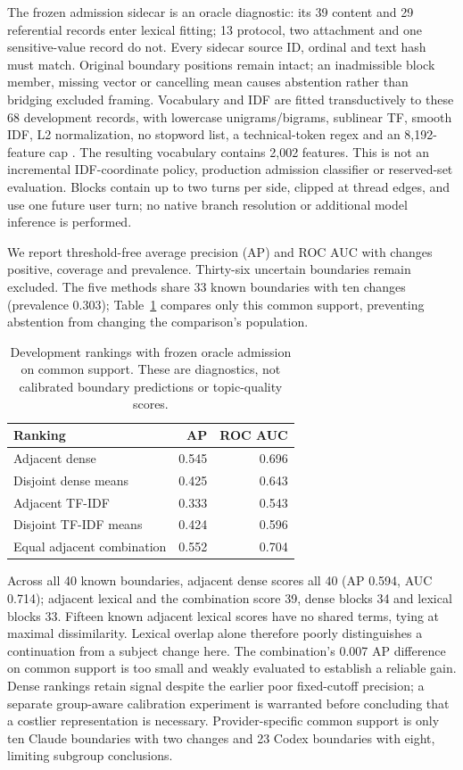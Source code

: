 \documentclass[11pt]{article}
\begin{document}
The frozen admission sidecar is an oracle diagnostic: its 39 content and 29
referential records enter lexical fitting; 13 protocol, two attachment and one
sensitive-value record do not. Every sidecar source ID, ordinal and text hash
must match. Original boundary positions remain intact; an inadmissible block
member, missing vector or cancelling mean causes abstention rather than bridging
excluded framing. Vocabulary and IDF are fitted transductively to these 68
development records, with lowercase unigrams/bigrams, sublinear TF, smooth IDF,
L2 normalization, no stopword list, a technical-token regex and an 8,192-feature
cap \cite{tfidf}. The resulting vocabulary contains 2,002 features. This is not
an incremental IDF-coordinate policy, production admission classifier or
reserved-set evaluation. Blocks contain up to two turns per side, clipped at
thread edges, and use one future user turn; no native
branch resolution or additional model inference is performed.

We report threshold-free average precision (AP) and ROC AUC with changes positive,
coverage and prevalence. Thirty-six uncertain boundaries remain excluded.
The five methods share 33 known boundaries with ten changes (prevalence 0.303);
Table~\ref{tab:lexical-rank} compares only this common support, preventing
abstention from changing the comparison's population.
\begin{table}[ht]
\centering
\begin{tabular}{lrr}
\toprule
Ranking & AP & ROC AUC\\
\midrule
Adjacent dense &0.545&0.696\\
Disjoint dense means &0.425&0.643\\
Adjacent TF-IDF &0.333&0.543\\
Disjoint TF-IDF means &0.424&0.596\\
Equal adjacent combination &0.552&0.704\\
\bottomrule
\end{tabular}
\caption{Development rankings with frozen oracle admission on common support.
These are diagnostics, not calibrated boundary predictions or topic-quality scores.}
\label{tab:lexical-rank}
\end{table}

Across all 40 known boundaries, adjacent dense scores all 40 (AP 0.594,
AUC 0.714); adjacent lexical and the combination score 39, dense blocks 34
and lexical blocks 33. Fifteen known adjacent lexical scores have no shared
terms, tying at maximal dissimilarity. Lexical overlap alone therefore poorly
distinguishes a continuation from a subject change here. The combination's
0.007 AP difference on common support is too small and weakly evaluated to
establish a reliable gain. Dense rankings retain signal despite the earlier
poor fixed-cutoff precision; a separate group-aware calibration experiment is
warranted before concluding that a costlier representation is necessary.
Provider-specific common support is only ten Claude boundaries with two changes
and 23 Codex boundaries with eight, limiting subgroup conclusions.
\end{document}
